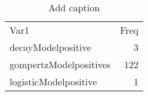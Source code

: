 \begin{table}[htbp]
  \centering
  \caption{Add caption}
    \begin{tabular}{lr}
    Var1  & \multicolumn{1}{l}{Freq} \\
    decayModelpositive & 3 \\
    gompertzModelpositives & 122 \\
    logisticModelpositive & 1 \\
    \end{tabular}%
  \label{tab:addlabel}%
\end{table}%
